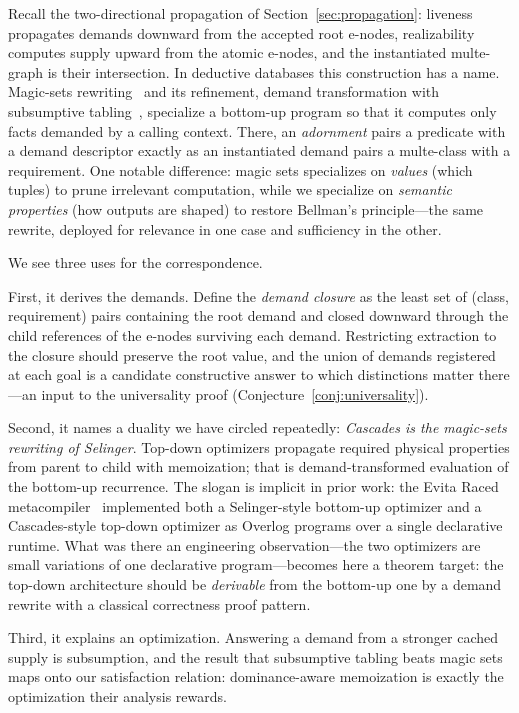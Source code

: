 \documentclass[sigconf,nonacm]{acmart}
\theoremstyle{definition}
\theoremstyle{plain}
\theoremstyle{remark}
\begin{document}
Recall the two-directional propagation of
Section~\ref{sec:propagation}: liveness propagates demands downward
from the accepted root e-nodes, realizability computes supply upward
from the atomic e-nodes, and the instantiated multe-graph is their
intersection.  In deductive databases this construction has a name.
Magic-sets rewriting~\cite{bancilhon1986magic} and its refinement,
demand transformation with subsumptive
tabling~\cite{tekle2011subsumptive}, specialize a bottom-up program
so that it computes only facts demanded by a calling context.
There, an \emph{adornment} pairs a predicate with a demand
descriptor exactly as an instantiated demand pairs a multe-class
with a requirement.  One notable difference: magic sets specializes
on \emph{values} (which tuples) to prune irrelevant computation,
while we specialize on \emph{semantic properties} (how outputs are
shaped) to restore Bellman's principle---the same rewrite, deployed
for relevance in one case and sufficiency in the other.

We see three uses for the correspondence.

First, it derives the demands.  Define the \emph{demand closure} as
the least set of (class, requirement) pairs containing the root
demand and closed downward through the child references of the
e-nodes surviving each demand.  Restricting extraction to the
closure should preserve the root value, and the union of demands
registered at each goal is a candidate constructive answer to which
distinctions matter there---an input to the universality proof
(Conjecture~\ref{conj:universality}).

Second, it names a duality we have circled repeatedly:
\emph{Cascades is the magic-sets rewriting of Selinger}.  Top-down
optimizers propagate required physical properties from parent to
child with memoization; that is demand-transformed evaluation of the
bottom-up recurrence.  The slogan is implicit in prior work: the
Evita Raced metacompiler~\cite{condie2008evita} implemented both a
Selinger-style bottom-up optimizer and a Cascades-style top-down
optimizer as Overlog programs over a single declarative runtime.
What was there an engineering observation---the two optimizers are
small variations of one declarative program---becomes here a theorem
target: the top-down architecture should be \emph{derivable} from
the bottom-up one by a demand rewrite with a classical correctness
proof pattern.

Third, it explains an optimization.  Answering a demand from a
stronger cached supply is subsumption, and the result that
subsumptive tabling beats magic sets~\cite{tekle2011subsumptive}
maps onto our satisfaction relation: dominance-aware memoization is
exactly the optimization their analysis rewards.
\end{document}
